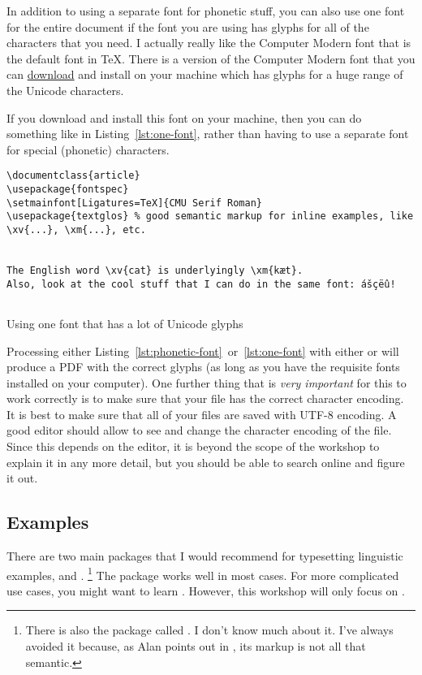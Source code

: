 In addition to using a separate font for phonetic stuff, you can also use one font for the entire document if the font you are using has glyphs for all of the characters that you need.
I actually really like the Computer Modern font that is the default font in \TeX.
There is a version of the Computer Modern font that you can \href{http://sourceforge.net/projects/cm-unicode/}{download} and install on your machine which has glyphs for a huge range of the Unicode characters.

If you download and install this font on your machine, then you can do something like in Listing~\ref{lst:one-font}, rather than having to use a separate font for special (phonetic) characters.

\begin{listing}[htbp]
	\centering
	\begin{verbatim}
\documentclass{article}
\usepackage{fontspec}
\setmainfont[Ligatures=TeX]{CMU Serif Roman}
\usepackage{textglos} % good semantic markup for inline examples, like \xv{...}, \xm{...}, etc.


The English word \xv{cat} is underlyingly \xm{kæt}.
Also, look at the cool stuff that I can do in the same font: ášçëû!


	\end{verbatim}
	\caption{Using one font that has a lot of Unicode glyphs}
	\label{lst:one-font}
\end{listing}

Processing either Listing~\ref{lst:phonetic-font}~or~\ref{lst:one-font} with either  or  will produce a PDF with the correct glyphs (as long as you have the requisite fonts installed on your computer).
One further thing that is \emph{very important} for this to work correctly is to make sure that your  file has the correct character encoding.
It is best to make sure that all of your  files are saved with UTF-8 encoding.
A good editor should allow to see and change the character encoding of the file.
Since this depends on the editor, it is beyond the scope of the workshop to explain it in any more detail, but you should be able to search online and figure it out.

\subsection{Examples}
\label{subsec:examples}

There are two main packages that I would recommend for typesetting linguistic examples,  and .%
\footnote{%
There is also the package called .
I don't know much about it.
I've always avoided it because, as Alan points out in , its markup is not all that semantic.%
}
The  package works well in most cases.
For more complicated use cases, you might want to learn .
However, this workshop will only focus on .

